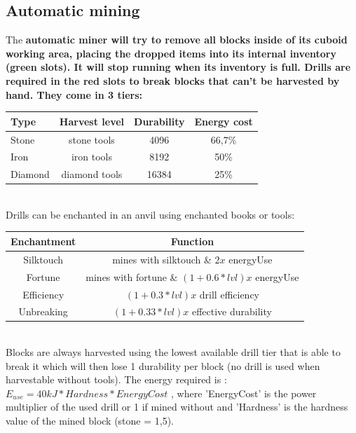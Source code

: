 \documentclass[11pt]{article} %
\begin{document}
\subsection{Automatic mining}
The \bf automatic miner \rm will try to remove all blocks inside of its cuboid working area, placing the dropped items into its internal inventory (green slots). It will stop running when its inventory is full. \bf Drills \rm are required in the red slots to break blocks that can't be harvested by hand. They come in 3 tiers:\\
\begin{tabular}{| l | c | c | c |} \hline  
\bf Type & \bf Harvest level & \bf Durability & \bf Energy cost \\ \hline
Stone & stone tools & 4096 & 66,7\% \\
Iron & iron tools & 8192 & 50\% \\
Diamond & diamond tools & 16384 & 25\% \\ \hline
\end{tabular} \\
Drills can be enchanted in an anvil using enchanted books or tools: \\
\begin{tabular}{| c | c |} \hline
\bf Enchantment & \bf Function \\ \hline
Silktouch & mines with silktouch \& $2x$ energyUse \\ \hline
Fortune & mines with fortune \& $(1+0.6*lvl)x$ energyUse \\ \hline
Efficiency & $(1+0.3*lvl)x$ drill efficiency \\ \hline
Unbreaking & $(1+0.33*lvl)x$ effective durability \\ \hline
\end{tabular} \\
Blocks are always harvested using the lowest available drill tier that is able to break it which will then lose 1 durability per block (no drill is used when harvestable without tools). The energy required is : ${E_{use} = 40kJ * Hardness * EnergyCost}$ , where 'EnergyCost' is the power multiplier of the used drill or 1 if mined without and 'Hardness' is the hardness value of the mined block (stone = 1,5). 
\end{document}
